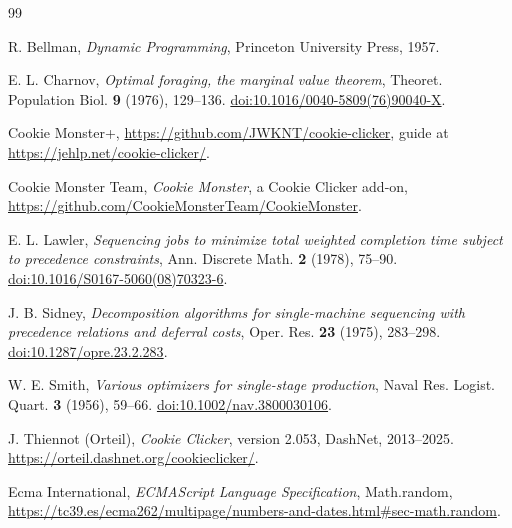 \documentclass[11pt,a4paper]{article}
\numberwithin{equation}{section}
\theoremstyle{definition}
\theoremstyle{remark}
\begin{document}
\clearpage
\begin{thebibliography}{99}
\small
{}
R. Bellman,
\emph{Dynamic Programming},
Princeton University Press, 1957.

E. L. Charnov,
\emph{Optimal foraging, the marginal value theorem},
Theoret. Population Biol. \textbf{9} (1976), 129--136.
\href{https://doi.org/10.1016/0040-5809(76)90040-X}{doi:10.1016/0040-5809(76)90040-X}.

Cookie Monster+,
\url{https://github.com/JWKNT/cookie-clicker}, guide at \url{https://jehlp.net/cookie-clicker/}.

Cookie Monster Team,
\emph{Cookie Monster}, a Cookie Clicker add-on,
\url{https://github.com/CookieMonsterTeam/CookieMonster}.

E. L. Lawler,
\emph{Sequencing jobs to minimize total weighted completion time subject to precedence constraints},
Ann. Discrete Math. \textbf{2} (1978), 75--90.
\href{https://doi.org/10.1016/S0167-5060(08)70323-6}{doi:10.1016/S0167-5060(08)70323-6}.

J. B. Sidney,
\emph{Decomposition algorithms for single-machine sequencing with precedence relations and deferral costs},
Oper. Res. \textbf{23} (1975), 283--298.
\href{https://doi.org/10.1287/opre.23.2.283}{doi:10.1287/opre.23.2.283}.

W. E. Smith,
\emph{Various optimizers for single-stage production},
Naval Res. Logist. Quart. \textbf{3} (1956), 59--66.
\href{https://doi.org/10.1002/nav.3800030106}{doi:10.1002/nav.3800030106}.

J. Thiennot (Orteil),
\emph{Cookie Clicker}, version 2.053,
DashNet, 2013--2025. \url{https://orteil.dashnet.org/cookieclicker/}.

Ecma International,
\emph{ECMAScript Language Specification}, Math.random,
\url{https://tc39.es/ecma262/multipage/numbers-and-dates.html#sec-math.random}.
\end{thebibliography}
\end{document}
